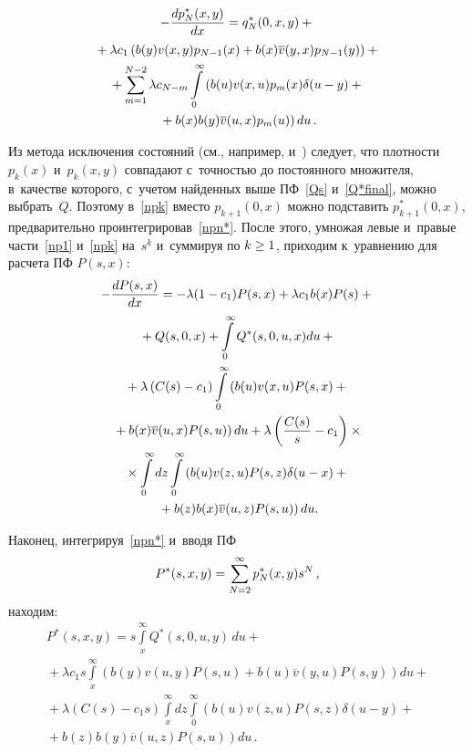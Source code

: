 \begin{multicols}{2}
\vspace*{-12pt}

\noindent
\begin{multline}
\label{npn*}
-\displaystyle\frac{\displaystyle dp^*_N(x,y)\mathstrut}{\displaystyle dx\mathstrut} = q^*_N(0,x,y) +{}\\
{}+ \lambda c_1
\left (
b(y) v(x,y) p_{N-1}(x) + b(x) \overline{v}(y,x) p_{N-1}(y)
\right )
+{}\\
{}+
\sum\limits_{m=1}^{N-2}
\lambda c_{N-m}
\int\limits_0^\infty
\left ( b(u) v(x,u) p_m(x)\delta(u-y) +{}\right.\\
\left.{}+ b(x) b(y) \overline{v}(u,x) p_m(u)
\right )du\,.
\end{multline}

\noindent 
Из метода исключения состояний 
(см., например, \cite{n1,n3,n4,n5} и~\cite[с.~75]{new1})
следует, что плотности $p_k(x)$ и~$p_k(x,y)$ совпадают 
с~точ\-ностью до постоянного множителя, в~качестве которого, 
с~учетом найденных выше ПФ~\eqref{Qs} и~\eqref{Q*final}, можно выбрать~$Q$.
Поэтому в~\eqref{npk} вместо $p_{k+1}(0,x)$
можно подставить $p^*_{k+1}(0,x)$, предварительно
проинтегрировав~\eqref{npn*}.
После этого, умножая левые и~правые части~\eqref{np1} и~\eqref{npk} 
на~$s^k$ и~суммируя по $k \hm\ge 1$, приходим к~уравнению для
расчета ПФ $P(s,x)$:
\begin{multline*}
-\displaystyle\frac{\displaystyle dP(s,x) \mathstrut}{\displaystyle dx\mathstrut} =
-\lambda (1-c_1) P(s,x) + \lambda c_1 b(x) P(s) +{}\\
{}+ Q(s,0,x)
+ \int\limits_0^\infty Q^*(s,0,u,x)du
+ {}\\
{}+\lambda \left ( C(s) - c_1 \right )
\int\limits_0^\infty \left (
b(u) v(x,u) P(s,x) +{}\right.\\
\left.{}+ b(x) \overline{v}(u,x) P(s,u) \right ) du
+
\lambda \left ( \displaystyle\frac{\displaystyle C(s)\mathstrut}{\displaystyle s\mathstrut} - c_1 \right )\times{}\\
{}\times
\int\limits_0^\infty dz
\int\limits_0^\infty \left (
b(u) v(z,u) P(s,z) \delta(u-x) +{}\right.\\
\left.{}+ b(z) b(x) \overline{v}(u,z) P(s,u)
\right ) du.
\end{multline*}

\noindent 
Наконец, интегрируя~\eqref{npn*} и~вводя ПФ %
$$P^*(s,x,y)\hm=\sum\limits_{N=2}^\infty p^*_{N}(x,y)s^N\,,
$$
находим:
\begin{multline*}
P^*(s,x,y)= s\int\limits_x^\infty Q^*(s,0,u,y)\,du +{}\\
{}+
\lambda c_1 s \!\int\limits_x^\infty \!\left ( b(y) v(u,y) P(s,u) +
b(u) \overline{v}(y,u) P(s,y)\right ) du
+{}\\
{}+
\lambda \left(C(s)-c_1 s\right) \!\int\limits_x^\infty\!
dz \!\int\limits_0^\infty \!\left (
b(u) v(z,u) P(s,z) \delta(u-y) +{}\right.\\
\left.{}+ b(z) b(y) \overline{v}(u,z)  P(s,u)
\right )du\,.
\end{multline*}


\end{multicols}
